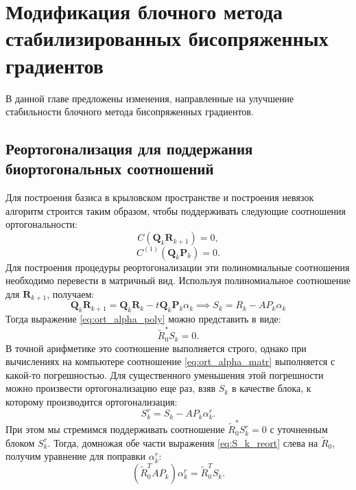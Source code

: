 \section{Модификация блочного метода стабилизированных бисопряженных градиентов}
\label{sec:Chapter3} 
В данной главе предложены изменения, направленные на улучшение стабильности блочного метода 
бисопряженных градиентов. 
\subsection{Реортогонализация для поддержания биортогональных соотношений}
Для построения базиса в крыловском пространстве и построения невязок алгоритм 
строится таким образом, чтобы поддерживать следующие соотношения ортогональности:
\begin{equation}
    \label{eq:ort_alpha_poly}
    C(\mathbf{Q}_{k} \mathbf{R}_{k+1}) = 0,
\end{equation}
\begin{equation}
    \label{eq:ort_beta_poly}
    C^{(1)}(\mathbf{Q}_{k} \mathbf{P}_k) = 0. 
\end{equation}
Для построения процедуры реортогонализации эти полиномиальные соотношения необходимо 
перевести в матричный вид.
Используя полиномиальное соотношение для $\mathbf{R}_{k+1}$, получаем:
$$\mathbf{Q}_{k}\mathbf{R}_{k+1} = \mathbf{Q}_{k}\mathbf{R}_{k} - t\mathbf{Q}_{k}\mathbf{P}_{k}\alpha_k \implies S_k = R_k - AP_k\alpha_k $$
Тогда выражение \eqref{eq:ort_alpha_poly} можно представить в виде:
\begin{equation}
    \label{eq:ort_alpha_matr}
    \tilde{R}_0^* S_k = 0.
\end{equation}
В точной арифметике это соотношение выполняется строго, однако при вычислениях на компьютере 
соотношение \eqref{eq:ort_alpha_matr} выполняется с какой-то погрешностью. Для существенного уменьшения 
этой погрешности можно произвести ортогонализацию еще раз, взяв $S_k$ в качестве блока, к которому производится
ортогонализация:
\begin{equation}
    \label{eq:S_k_reort}
    S_k^{r} = S_k - AP_k\alpha_k^r.
\end{equation}
При этом мы стремимся поддерживать соотношение $\tilde{R}_0^*S_k^r=0$ с уточненным блоком $S_k^r$.
Тогда, домножая обе части выражения \eqref{eq:S_k_reort} слева на $\tilde{R}_0$, получим уравнение для 
поправки $\alpha_k^r$:
\begin{equation*}
    (\tilde{R}_0^TAP_k)\alpha_k^r = \tilde{R}_0^TS_k.
\end{equation*}

